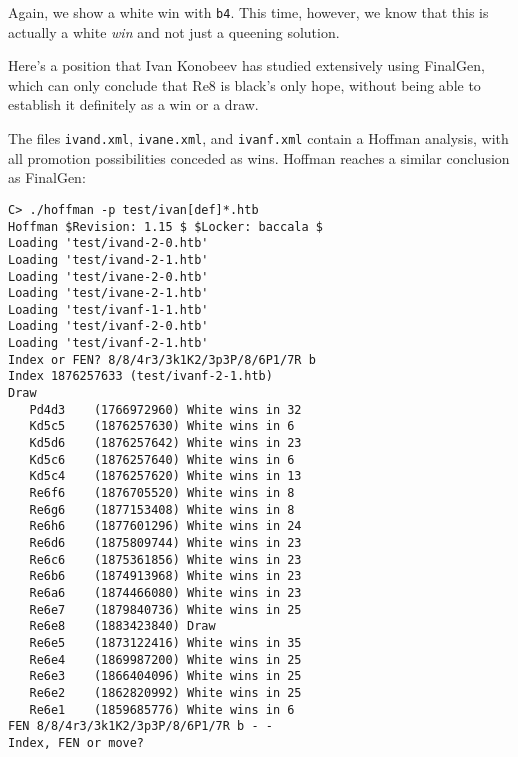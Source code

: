 \documentclass[11pt]{article}
\begin{document}
Again, we show a white win with {\tt b4}.  This time, however, we know
that this is actually a white {\it win} and not just a queening
solution.



Here's a position that Ivan Konobeev has studied extensively using
FinalGen, which can only conclude that Re8 is black's only hope,
without being able to establish it definitely as a win or a draw.

\showboard

The files {\tt ivand.xml}, {\tt ivane.xml}, and {\tt ivanf.xml}
contain a Hoffman analysis, with all promotion possibilities conceded
as wins.  Hoffman reaches a similar conclusion as FinalGen:

\begin{verbatim}
C> ./hoffman -p test/ivan[def]*.htb
Hoffman $Revision: 1.15 $ $Locker: baccala $
Loading 'test/ivand-2-0.htb'
Loading 'test/ivand-2-1.htb'
Loading 'test/ivane-2-0.htb'
Loading 'test/ivane-2-1.htb'
Loading 'test/ivanf-1-1.htb'
Loading 'test/ivanf-2-0.htb'
Loading 'test/ivanf-2-1.htb'
Index or FEN? 8/8/4r3/3k1K2/3p3P/8/6P1/7R b
Index 1876257633 (test/ivanf-2-1.htb)
Draw
   Pd4d3    (1766972960) White wins in 32
   Kd5c5    (1876257630) White wins in 6
   Kd5d6    (1876257642) White wins in 23
   Kd5c6    (1876257640) White wins in 6
   Kd5c4    (1876257620) White wins in 13
   Re6f6    (1876705520) White wins in 8
   Re6g6    (1877153408) White wins in 8
   Re6h6    (1877601296) White wins in 24
   Re6d6    (1875809744) White wins in 23
   Re6c6    (1875361856) White wins in 23
   Re6b6    (1874913968) White wins in 23
   Re6a6    (1874466080) White wins in 23
   Re6e7    (1879840736) White wins in 25
   Re6e8    (1883423840) Draw
   Re6e5    (1873122416) White wins in 35
   Re6e4    (1869987200) White wins in 25
   Re6e3    (1866404096) White wins in 25
   Re6e2    (1862820992) White wins in 25
   Re6e1    (1859685776) White wins in 6
FEN 8/8/4r3/3k1K2/3p3P/8/6P1/7R b - -
Index, FEN or move? 
\end{verbatim}
\end{document}
